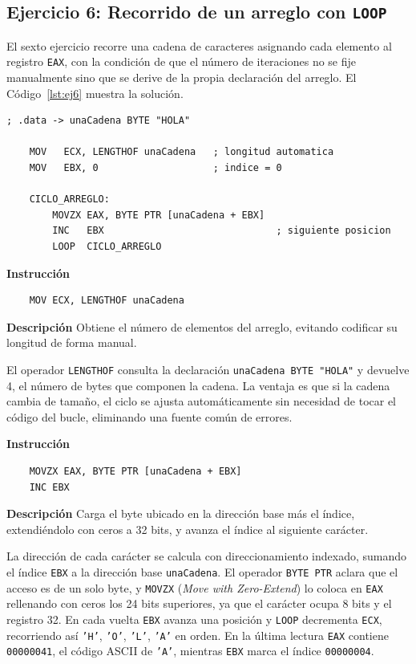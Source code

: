 \documentclass[a4paper,12pt]{article}
\newcommand{\hex}[1]{\texttt{\textcolor{hexcolor}{#1}}}
\begin{document}
\subsection{Ejercicio 6: Recorrido de un arreglo con \texttt{LOOP}}
El sexto ejercicio recorre una cadena de caracteres asignando cada elemento al registro \texttt{EAX}, con la condición de que el número de iteraciones no se fije manualmente sino que se derive de la propia declaración del arreglo. El Código~\ref{lst:ej6} muestra la solución.

\begin{lstlisting}[style=assemblyStyle, caption={Recorrido de una cadena cargando cada carácter en \texttt{EAX}.}, label={lst:ej6}]
; .data -> unaCadena BYTE "HOLA"

    MOV   ECX, LENGTHOF unaCadena   ; longitud automatica
    MOV   EBX, 0                    ; indice = 0

    CICLO_ARREGLO:
        MOVZX EAX, BYTE PTR [unaCadena + EBX]
        INC   EBX                              ; siguiente posicion
        LOOP  CICLO_ARREGLO
\end{lstlisting}

\begin{instruccionbox}
\textbf{Instrucción}
\begin{lstlisting}
    MOV ECX, LENGTHOF unaCadena
\end{lstlisting}
\textbf{Descripción}
Obtiene el número de elementos del arreglo, evitando codificar su longitud de forma manual.
\end{instruccionbox}

El operador \texttt{LENGTHOF} consulta la declaración \texttt{unaCadena BYTE "HOLA"} y devuelve 4, el número de bytes que componen la cadena. La ventaja es que si la cadena cambia de tamaño, el ciclo se ajusta automáticamente sin necesidad de tocar el código del bucle, eliminando una fuente común de errores.

\begin{instruccionbox}
\textbf{Instrucción}
\begin{lstlisting}
    MOVZX EAX, BYTE PTR [unaCadena + EBX]
    INC EBX
\end{lstlisting}
\textbf{Descripción}
Carga el byte ubicado en la dirección base más el índice, extendiéndolo con ceros a 32 bits, y avanza el índice al siguiente carácter.
\end{instruccionbox}

La dirección de cada carácter se calcula con direccionamiento indexado, sumando el índice \texttt{EBX} a la dirección base \texttt{unaCadena}. El operador \texttt{BYTE PTR} aclara que el acceso es de un solo byte, y \texttt{MOVZX} (\textit{Move with Zero-Extend}) lo coloca en \texttt{EAX} rellenando con ceros los 24 bits superiores, ya que el carácter ocupa 8 bits y el registro 32. En cada vuelta \texttt{EBX} avanza una posición y \texttt{LOOP} decrementa \texttt{ECX}, recorriendo así \texttt{'H'}, \texttt{'O'}, \texttt{'L'}, \texttt{'A'} en orden. En la última lectura \texttt{EAX} contiene \hex{00000041}, el código ASCII de \texttt{'A'}, mientras \texttt{EBX} marca el índice \hex{00000004}.
\end{document}
